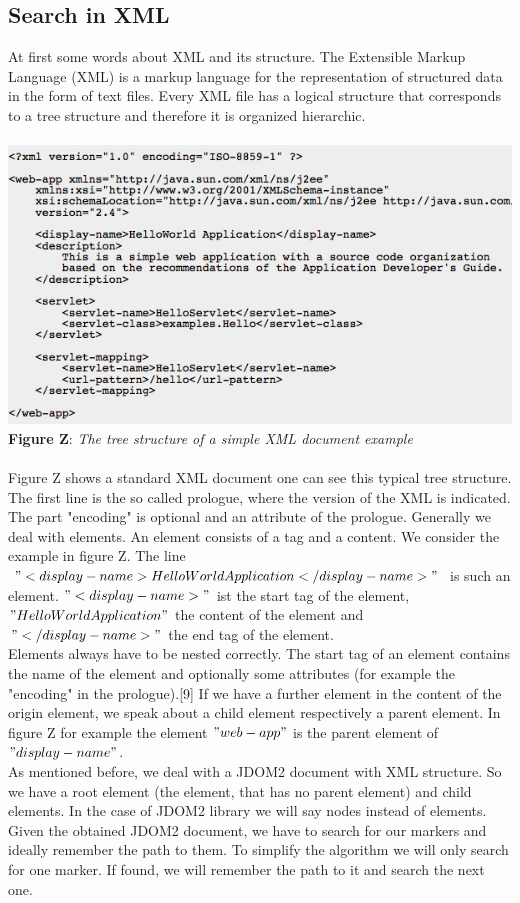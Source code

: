 \subsection{Search in XML}
At first some words about XML and its structure. The Extensible Markup Language (XML) is a markup language for the representation of structured data in the form of text files. Every XML file has a logical structure that corresponds to a tree structure and therefore it is organized hierarchic.
\\ \\ \includegraphics[width=1.0\textwidth]{xml_sample.png}  \\\textbf{Figure Z}: \textit{The tree structure of a simple XML document example}  \\ \\  Figure Z shows a standard XML document one can see this typical tree structure. The first line is the so called prologue, where the version of the XML is indicated. The part "encoding" is optional and an attribute of the prologue. Generally we deal with elements. An element consists of a tag and a content. We consider the example in figure Z. The line  $"<display-name>HelloWorld Application</display-name>"$ is such an element. $"<display-name>"$ ist the start tag of the element, $"HelloWorld Application"$ the content of the element and $"</display-name>"$ the end tag of the element. \\ Elements always have to be nested correctly. The start tag of an element contains the name of the element and optionally some attributes (for example the "encoding" in the prologue).[9] If we have a further element in the content of the origin element, we speak about a child element respectively a parent element. In figure Z for example the element $"web-app"$ is the parent element of $"display-name"$.\\ As mentioned before, we deal with a JDOM2 document with XML structure. So we have a root element (the element, that has no parent element) and child elements. In the case of JDOM2 library we will say nodes instead of elements.\\ Given the obtained JDOM2 document, we have to search for our markers and ideally remember the path to them. To simplify the algorithm we will only search for one marker. If found, we will remember the path to it and search the next one.  \\




